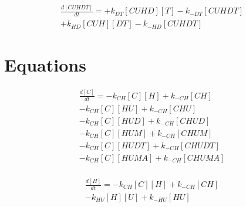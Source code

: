 \begin{equation}
\begin{split}
\frac{d[CUHDT]}{dt} = + k_{DT}[CUHD][T] - k_{-DT}[CUHDT] \\%
                     + k_{HD}[CUH][DT] - k_{-HD}[CUHDT] %
\end{split}
\end{equation}

\section{Equations}

\begin{equation}
\begin{split}
\frac{d[C]}{dt} =     - k_{CH}[C][H]    + k_{-CH}[CH]     \\%
                      - k_{CH}[C][HU]   + k_{-CH}[CHU]    \\%
                      - k_{CH}[C][HUD]  + k_{-CH}[CHUD]   \\%
                      - k_{CH}[C][HUM]  + k_{-CH}[CHUM]   \\%
                      - k_{CH}[C][HUDT] + k_{-CH}[CHUDT]  \\%
                      - k_{CH}[C][HUMA] + k_{-CH}[CHUMA]  \\%
\end{split}
\end{equation}

\begin{equation}
\begin{split}
\frac{d[H]}{dt} =     - k_{CH}[C][H]    + k_{-CH}[CH]     \\%
                      - k_{HU}[H][U]    + k_{-HU}[HU]     \\%
\end{split}
\end{equation}

